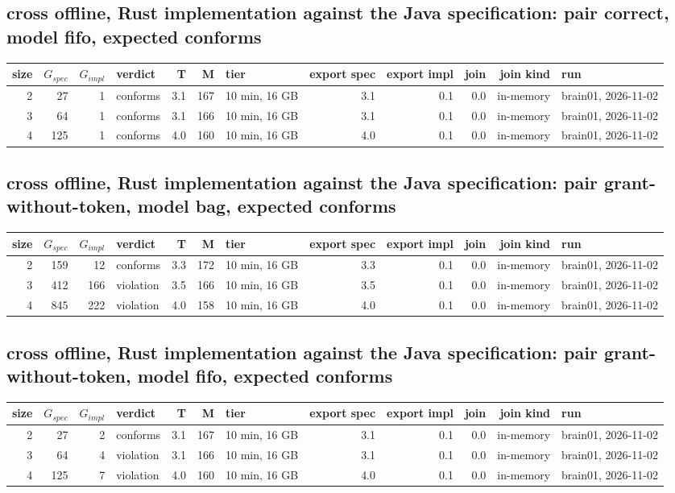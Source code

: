 \documentclass[10pt]{article}
\begin{document}
\subsection*{cross offline, Rust implementation against the Java specification: pair \textsf{correct}, model fifo, expected conforms}
\begin{longtable}{@{}rrrlrrlrrrrl@{}}
\toprule
size & $G_{\mathit{spec}}$ & $G_{\mathit{impl}}$ & verdict & T & M & tier & export spec & export impl & join & join kind & run \\
\midrule
\endhead
\color{red} 2 & 27 & 1 & conforms & 3.1 & 167 & 10 min, 16 GB & 3.1 & 0.1 & 0.0 & in-memory & brain01, 2026-11-02 \\
\color{red} 3 & 64 & 1 & conforms & 3.1 & 166 & 10 min, 16 GB & 3.1 & 0.1 & 0.0 & in-memory & brain01, 2026-11-02 \\
\color{red} 4 & 125 & 1 & conforms & 4.0 & 160 & 10 min, 16 GB & 4.0 & 0.1 & 0.0 & in-memory & brain01, 2026-11-02 \\
\bottomrule
\end{longtable}
\subsection*{cross offline, Rust implementation against the Java specification: pair \textsf{grant-without-token}, model bag, expected conforms}
\begin{longtable}{@{}rrrlrrlrrrrl@{}}
\toprule
size & $G_{\mathit{spec}}$ & $G_{\mathit{impl}}$ & verdict & T & M & tier & export spec & export impl & join & join kind & run \\
\midrule
\endhead
\color{red} 2 & 159 & 12 & conforms & 3.3 & 172 & 10 min, 16 GB & 3.3 & 0.1 & 0.0 & in-memory & brain01, 2026-11-02 \\
\color{red} 3 & 412 & 166 & violation & 3.5 & 166 & 10 min, 16 GB & 3.5 & 0.1 & 0.0 & in-memory & brain01, 2026-11-02 \\
\color{red} 4 & 845 & 222 & violation & 4.0 & 158 & 10 min, 16 GB & 4.0 & 0.1 & 0.0 & in-memory & brain01, 2026-11-02 \\
\bottomrule
\end{longtable}
\subsection*{cross offline, Rust implementation against the Java specification: pair \textsf{grant-without-token}, model fifo, expected conforms}
\begin{longtable}{@{}rrrlrrlrrrrl@{}}
\toprule
size & $G_{\mathit{spec}}$ & $G_{\mathit{impl}}$ & verdict & T & M & tier & export spec & export impl & join & join kind & run \\
\midrule
\endhead
\color{red} 2 & 27 & 2 & conforms & 3.1 & 167 & 10 min, 16 GB & 3.1 & 0.1 & 0.0 & in-memory & brain01, 2026-11-02 \\
\color{red} 3 & 64 & 4 & violation & 3.1 & 166 & 10 min, 16 GB & 3.1 & 0.1 & 0.0 & in-memory & brain01, 2026-11-02 \\
\color{red} 4 & 125 & 7 & violation & 4.0 & 160 & 10 min, 16 GB & 4.0 & 0.1 & 0.0 & in-memory & brain01, 2026-11-02 \\
\bottomrule
\end{longtable}
\end{document}
